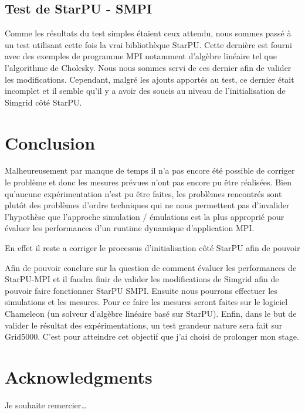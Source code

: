 \documentclass[smallextended]{svjour3}
\begin{document}
\subsection{Test de StarPU - SMPI}
\label{sec-6-2}
Comme les résultats du test simples étaient ceux attendu, nous
sommes passé à un test utilisant cette fois la vrai bibliothèque
StarPU. Cette dernière est fourni avec des exemples de programme MPI
notamment d'algèbre linéaire tel que l'algorithme de Cholesky. Nous
nous sommes servi de ces dernier afin de valider les
modifications. Cependant, malgré les ajouts apportés au test, ce 
dernier était incomplet et il semble qu'il y a avoir des soucis au
niveau de  l'initialisation de Simgrid côté StarPU.

\section{Conclusion}
\label{sec-7}
Malheureusement par manque de temps il n'a pas encore été possible
de corriger le problème et donc les mesures prévues n'ont pas encore
pu être réalisées. Bien qu'aucune expérimentation n'est pu être
faites, les problèmes rencontrés sont plutôt des problèmes d'ordre
techniques qui ne nous permettent pas d'invalider l'hypothèse que
l'approche simulation / émulations est la plus approprié pour
évaluer les performances d'un runtime dynamique d'application MPI.

En effet il reste a corriger le processus d'initialisation côté
StarPU afin de pouvoir


Afin de pouvoir conclure sur la question de comment évaluer les
performances de StarPU-MPI et il faudra finir de valider les
modifications de Simgrid afin de pouvoir faire fonctionner StarPU
SMPI. Ensuite nous pourrons effectuer les simulations et les
mesures. Pour ce faire les mesures seront faites sur le logiciel
Chameleon (un solveur d'algèbre linéaire basé sur StarPU).
Enfin, dans le but de valider le résultat des expérimentations, un test
grandeur nature sera fait sur Grid5000.
C'est pour atteindre cet objectif que j'ai choisi de prolonger mon stage.


\section*{Acknowledgments}
Je souhaite remercier\ldots{}

\def\raggedright{}


\end{document}

